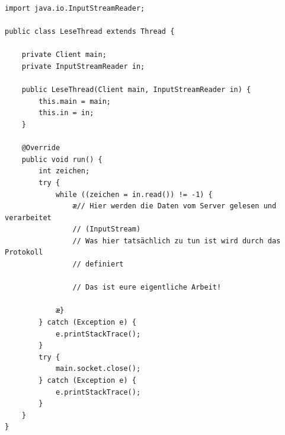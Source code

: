 \begin{lstlisting}
import java.io.InputStreamReader;

public class LeseThread extends Thread {

    private Client main;
    private InputStreamReader in;

    public LeseThread(Client main, InputStreamReader in) {
        this.main = main;
        this.in = in;
    }

    @Override
    public void run() {
        int zeichen;
        try {
            while ((zeichen = in.read()) != -1) {
                æ// Hier werden die Daten vom Server gelesen und verarbeitet
                // (InputStream)
                // Was hier tatsächlich zu tun ist wird durch das Protokoll
                // definiert

                // Das ist eure eigentliche Arbeit!

            æ}
        } catch (Exception e) {
            e.printStackTrace();
        }
        try {
            main.socket.close();
        } catch (Exception e) {
            e.printStackTrace();
        }
    }
}
\end{lstlisting}